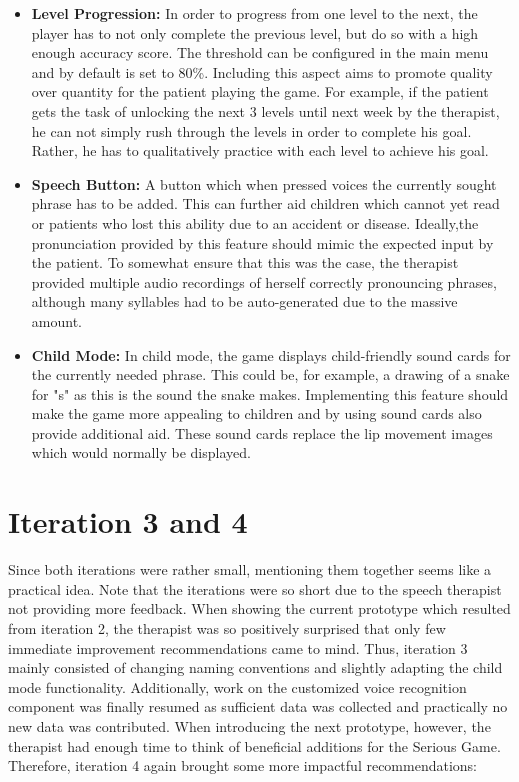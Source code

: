 \documentclass[draft,final]{vutinfth} %
\begin{document}
\begin{itemize}
\item \textbf{Level Progression:} In order to progress from one level to the next, the player has to not only complete the previous level, but do so with a high enough accuracy score. The threshold can be configured in the main menu and by default is set to 80\%. Including this aspect aims to promote quality over quantity for the patient playing the game. For example, if the patient gets the task of unlocking the next 3 levels until next week by the therapist, he can not simply rush through the levels in order to complete his goal. Rather, he has to qualitatively practice with each level to achieve his goal.
\item \textbf{Speech Button:} A button which when pressed voices the currently sought phrase has to be added. This can further aid children which cannot yet read or patients who lost this ability due to an accident or disease. Ideally,the pronunciation provided by this feature should mimic the expected input by the patient. To somewhat ensure that this was the case, the therapist provided multiple audio recordings of herself correctly pronouncing phrases, although many syllables had to be auto-generated due to the massive amount.
\item \textbf{Child Mode:} In child mode, the game displays child-friendly sound cards for the currently needed phrase. This could be, for example, a drawing of a snake for "s" as this is the sound the snake makes. Implementing this feature should make the game more appealing to children and by using sound cards also provide additional aid. These sound cards replace the lip movement images which would normally be displayed.
\end{itemize}
\section{Iteration 3 and 4}
Since both iterations were rather small, mentioning them together seems like a practical idea. Note that the iterations were so short due to the speech therapist not providing more feedback. When showing the current prototype which resulted from iteration 2, the therapist was so positively surprised that only few immediate improvement recommendations came to mind. Thus, iteration 3 mainly consisted of changing naming conventions and slightly adapting the child mode functionality. Additionally, work on the customized voice recognition component was finally resumed as sufficient data was collected and practically no new data was contributed. When introducing the next prototype, however, the therapist had enough time to think of beneficial additions for the Serious Game. Therefore, iteration 4 again brought some more impactful recommendations:
\end{document}
